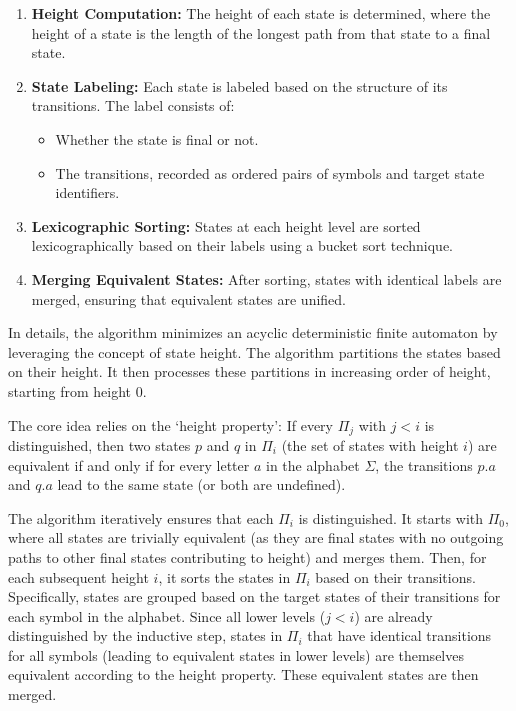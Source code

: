 \begin{enumerate}
    \item \textbf{Height Computation:} The height of each state is determined, where the height of a state is the length of the longest path from that state to a final state.
    \item \textbf{State Labeling:} Each state is labeled based on the structure of its transitions. The label consists of:
    \begin{itemize}
        \item Whether the state is final or not.
        \item The transitions, recorded as ordered pairs of symbols and target state identifiers.
    \end{itemize}
    \item \textbf{Lexicographic Sorting:} States at each height level are sorted lexicographically based on their labels using a bucket sort technique.
    \item \textbf{Merging Equivalent States:} After sorting, states with identical labels are merged, ensuring that equivalent states are unified.
\end{enumerate}

In details, the algorithm minimizes an acyclic deterministic finite automaton by leveraging the concept of state height. The algorithm partitions the states based on their height. It then processes these partitions in increasing order of height, starting from height 0.

The core idea relies on the `height property': If every $\Pi_j$ with $j < i$ is distinguished, then two states $p$ and $q$ in $\Pi_i$ (the set of states with height $i$) are equivalent if and only if for every letter $a$ in the alphabet $\Sigma$, the transitions $p.a$ and $q.a$ lead to the same state (or both are undefined).

The algorithm iteratively ensures that each $\Pi_i$ is distinguished. It starts with $\Pi_0$, where all states are trivially equivalent (as they are final states with no outgoing paths to other final states contributing to height) and merges them. Then, for each subsequent height $i$, it sorts the states in $\Pi_i$ based on their transitions. Specifically, states are grouped based on the target states of their transitions for each symbol in the alphabet. Since all lower levels ($j < i$) are already distinguished by the inductive step, states in $\Pi_i$ that have identical transitions for all symbols (leading to equivalent states in lower levels) are themselves equivalent according to the height property. These equivalent states are then merged.

